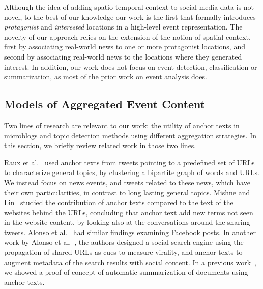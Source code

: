 
Although the idea of adding spatio-temporal context to social media data is
not novel, to the best of our knowledge our work is the first that formally
introduces {\em protagonist} and {\em interested} locations in a high-level
event representation.  
%
The novelty of our approach relies on the extension of the notion of spatial
context, first by associating real-world news to one or more protagonist
locations, and second by associating real-world news to the locations where they
generated interest.  
%
In addition, our work does not focus on event detection, classification or
summarization, as most of the prior work on event analysis does.




\subsection{Models of Aggregated Event Content}\label{sec:url-related}


Two lines of research are relevant to our work: the utility of anchor texts in
microblogs and topic detection methods using different aggregation strategies. 
%
In this section, we briefly review related work in those two lines.

%
Raux et
al.~\cite{raux2011describing} used anchor texts from tweets pointing to a
predefined set of URLs to characterize general topics, by clustering a bipartite
graph of words and URLs. 
%
We instead focus on news events, and tweets related to these news, which have
their own particularities, in contrast to long lasting general topics. 
%
Mishne and Lin~\cite{mishne2012twanchor} studied the contribution of anchor
texts compared to the text of the websites behind the URLs, concluding that
anchor text add new terms not seen in the website content, by looking also at
the conversations around the sharing tweets. 
%
Alonso et al.~\cite{Alonso:2015:WCW:2740908.2745397} had similar findings
examining Facebook posts. 
%
In another work by Alonso et al.~\cite{Alonso:2017:WHH:3091478.3091484}, the
authors designed a social search engine using the propagation of shared URLs as
cues to measure virality, and anchor texts to augment metadata of the search
results with social content. 
%
In a previous work~\cite{quezada2013understanding}, we showed a proof of concept
of automatic summarization of documents using anchor texts.
%


